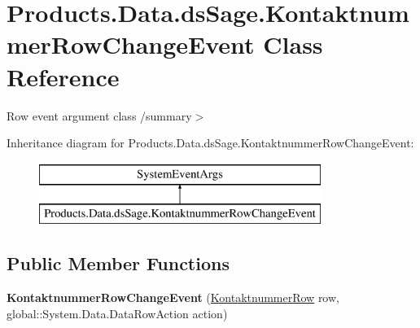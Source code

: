 \hypertarget{class_products_1_1_data_1_1ds_sage_1_1_kontaktnummer_row_change_event}{}\section{Products.\+Data.\+ds\+Sage.\+Kontaktnummer\+Row\+Change\+Event Class Reference}
\label{class_products_1_1_data_1_1ds_sage_1_1_kontaktnummer_row_change_event}


Row event argument class /summary$>$  


Inheritance diagram for Products.\+Data.\+ds\+Sage.\+Kontaktnummer\+Row\+Change\+Event\+:\begin{figure}[H]
\begin{center}
\leavevmode
\includegraphics[height=2.000000cm]{class_products_1_1_data_1_1ds_sage_1_1_kontaktnummer_row_change_event}
\end{center}
\end{figure}
\subsection*{Public Member Functions}
\begin{DoxyCompactItemize}
\item 
{\bfseries Kontaktnummer\+Row\+Change\+Event} (\hyperlink{class_products_1_1_data_1_1ds_sage_1_1_kontaktnummer_row}{Kontaktnummer\+Row} row, global\+::\+System.\+Data.\+Data\+Row\+Action action)\hypertarget{class_products_1_1_data_1_1ds_sage_1_1_kontaktnummer_row_change_event_a62f2fcc3ec78d8a3a0a220b0a050a16d}{}\label{class_products_1_1_data_1_1ds_sage_1_1_kontaktnummer_row_change_event_a62f2fcc3ec78d8a3a0a220b0a050a16d}

\end{DoxyCompactItemize}
